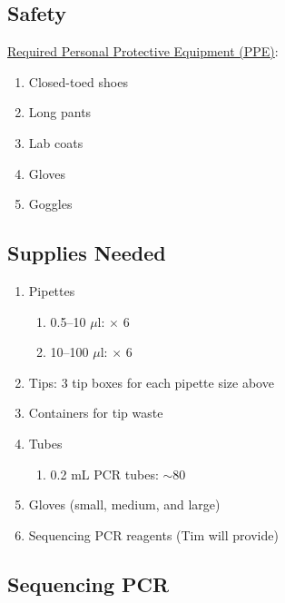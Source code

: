 \documentclass[12pt, hidelinks]{article}
\begin{document}
	\subsection{Safety}

	\underline{Required Personal Protective Equipment (PPE)}:
		\begin{enumerate}
			\item Closed-toed shoes
			\item Long pants
			\item Lab coats
			\item Gloves
			\item Goggles
		\end{enumerate}	
			
	
	\subsection{Supplies Needed}
		\begin{enumerate}
			\item Pipettes
				\begin{enumerate}
					\item 0.5--10 $\mu$l: $\times$ 6
					\item 10--100 $\mu$l: $\times$ 6
				\end{enumerate}
			\item Tips: 3 tip boxes for each pipette size above	
			\item Containers for tip waste
			\item Tubes
				\begin{enumerate}
					\item 0.2 mL PCR tubes: $\sim$80
				\end{enumerate}	
			\item Gloves (small, medium, and large)
			\item Sequencing PCR reagents (Tim will provide)
	\end{enumerate}	
	
	
	\subsection{Sequencing PCR}	
	
\end{document}
